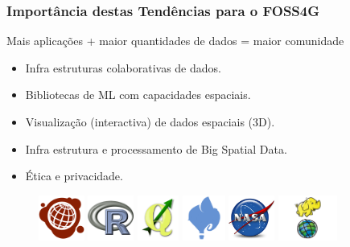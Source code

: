 \documentclass[hyperref={pdfpagelabels=true}]{beamer}
\begin{document}
\begin{frame}
\frametitle{Import\^{a}ncia destas Tend\^{e}ncias para o FOSS4G}

    Mais aplica\c{c}\~{o}es + maior quantidades de dados = maior comunidade\\%
    \begin{itemize}
    
        \item<2->Infra estruturas colaborativas de dados.%
        \item<2->Bibliotecas de ML com capacidades espaciais.%
        \item<2->Visualiza\c{c}\~{a}o (interactiva) de dados espaciais (3D).%
        \item<2->Infra estrutura e processamento de Big Spatial Data.
        \item<2->\'{E}tica e privacidade.%
    \end{itemize}                      

    \centering
        \begin{figure}   
            \includegraphics[height=1.5cm]{ushahidi.png}        
            \includegraphics[height=1.5cm]{R.png}
            \includegraphics[height=1.5cm]{qgis.png}
            \includegraphics[height=1.5cm]{cartodb.jpg}
            \includegraphics[height=1.5cm]{nasa.jpg}            
            \includegraphics[height=1.5cm]{GIS4Hadoop.png}
        \end{figure} 
        
    
\end{frame}
\end{document}
